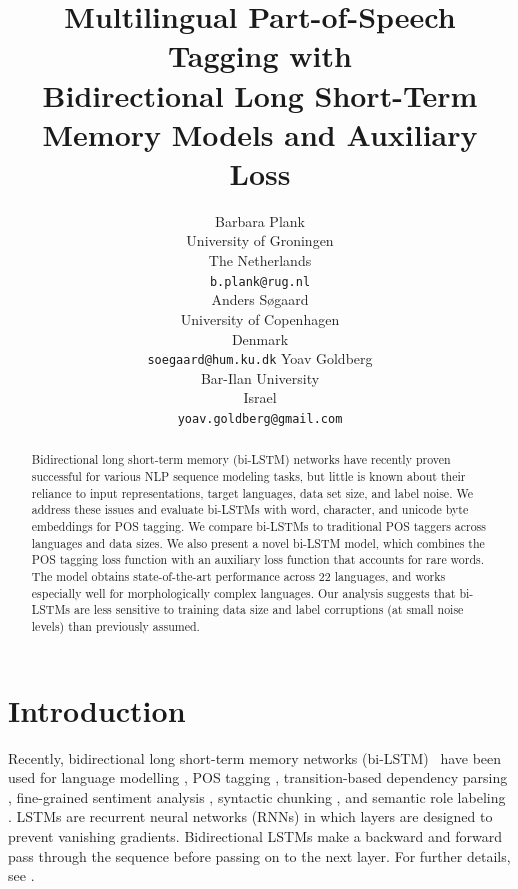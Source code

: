 \documentclass[11pt]{article}
\title{Multilingual Part-of-Speech Tagging with\\Bidirectional Long Short-Term Memory Models and Auxiliary Loss}
\author{Barbara Plank \\ University of Groningen \\ The Netherlands\\ {\tt b.plank@rug.nl}\\
         \And  Anders S\o{}gaard\\University of Copenhagen\\Denmark \\ {\tt soegaard@hum.ku.dk} \hspace*{0.2cm}
         \And Yoav Goldberg\\Bar-Ilan University\\Israel\\ {\tt yoav.goldberg@gmail.com}
         }
\date{}
\begin{document}
\maketitle

\begin{abstract}
Bidirectional long short-term memory (bi-LSTM) networks have recently proven successful for various NLP sequence modeling tasks, but little is known about their reliance to input representations, target languages, data set size, and label noise. 
We address these issues and evaluate bi-LSTMs with word, character, and unicode byte embeddings for POS tagging. We compare bi-LSTMs to traditional POS taggers across languages and data sizes. We also present a novel bi-LSTM model, which combines the POS tagging loss function with an auxiliary loss function that accounts for rare words. The model obtains state-of-the-art performance across 22 languages, and works especially well for morphologically complex languages. Our analysis suggests that bi-LSTMs are less sensitive to training data size and label corruptions (at small noise levels) than previously assumed. %
\end{abstract}

\section{Introduction}

Recently, bidirectional long short-term memory networks (bi-LSTM)~\cite{graves:schmidhuber:2005,Hochreiter:Schmidhuber:97} have been used for 
language modelling \cite{ling:ea:2015}, POS tagging \cite{ling:ea:2015,wang:ea:2015:arxiv}, transition-based dependency parsing \cite{ballesteros:ea:2015,kiperwasser:goldberg:2016}, fine-grained sentiment analysis \cite{Liu:ea:15}, syntactic chunking \cite{Huang:ea:15}, and semantic role labeling \cite{Zhou:Xu:15}. LSTMs are recurrent neural networks (RNNs) in which layers are designed to prevent vanishing gradients. Bidirectional LSTMs make a backward and forward pass through the sequence before passing on to the next layer. For further details, see \cite{goldberg-primer,cho-primer}.
\end{document}
